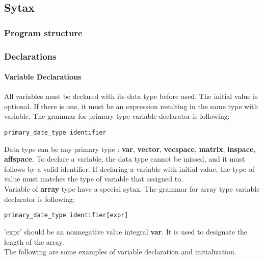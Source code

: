 \documentclass[12pt]{article} %
\begin{document}
\subsection{Sytax}
\subsubsection{Program structure}
\subsubsection{Declarations}

\paragraph{Variable Declarations}
All variables must be declared with its data type before used. The initial value is optional. If there is one, it must be an expression resulting in the same type with variable. The grammar for primary type variable declarator is following:
\begin{lstlisting}
primary_date_type identifier
\end{lstlisting}

Data type can be any primary type : \textbf{var}, \textbf{vector}, \textbf{vecspace}, \textbf{matrix}, \textbf{inspace}, \textbf{affspace}. To declare a variable, the data type cannot be missed, and it must follows by a valid identifier. If declaring a variable with initial value, the type of value must matches the type of variable that assigned to. \\

Variable of \textbf{array} type have a special sytax. The grammar for array type variable declarator is following:

\begin{lstlisting}
primary_date_type identifier[expr]
\end{lstlisting}

'expr' should be an nonnegative value integral \textbf{var}.  It is used to designate the length of the array. \\
The following are some examples of variable declaration and initialization.
\end{document}
